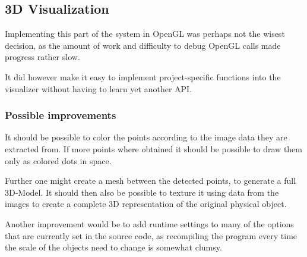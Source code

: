 \subsection{3D Visualization}
Implementing this part of the system in OpenGL was perhaps not the wisest decision, as the amount of work and difficulty to debug OpenGL calls made progress rather slow.

It did however make it easy to implement project-specific functions into the visualizer without having to learn yet another API.

\subsubsection{Possible improvements}
It should be possible to color the points according to the image data they are extracted from. If more points where obtained it should be possible to draw them only as colored dots in space.

Further one might create a mesh between the detected points, to generate a full 3D-Model. It should then also be possible to texture it using data from the images to create a complete 3D representation of the original physical object.

Another improvement would be to add runtime settings to many of the options that are currently set in the source code, as recompiling the program every time the scale of the objects need to change is somewhat clumsy.
